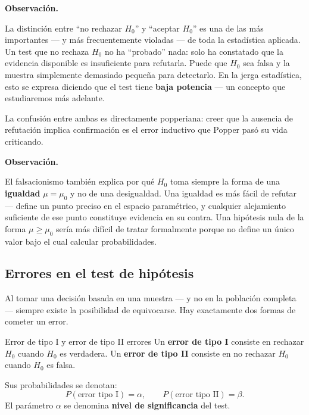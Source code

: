 \documentclass[12pt, a4paper]{book}
\newenvironment{observacion}{%
    \par\medskip\noindent\textbf{\color{azul}Observaci\'{o}n.}\enspace\itshape
}{\par\medskip}
\numberwithin{equation}{chapter}
\begin{document}
\begin{observacion}
	La distinci\'{o}n entre ``no rechazar $H_0$'' y
	``aceptar $H_0$'' es una de las m\'{a}s importantes
	--- y m\'{a}s frecuentemente violadas --- de toda
	la estad\'{i}stica aplicada. Un test que no rechaza
	$H_0$ no ha ``probado'' nada: solo ha constatado
	que la evidencia disponible es insuficiente para
	refutarla. Puede que $H_0$ sea falsa y la muestra
	simplemente demasiado peque\~{n}a para detectarlo.
	En la jerga estad\'{i}stica, esto se expresa
	diciendo que el test tiene \textbf{baja potencia}
	--- un concepto que estudiaremos m\'{a}s adelante.
	
	La confusi\'{o}n entre ambas es directamente
	popperiana: creer que la ausencia de refutaci\'{o}n
	implica confirmaci\'{o}n es el error inductivo que
	Popper pas\'{o} su vida criticando.
\end{observacion}

\begin{observacion}
	El falsacionismo tambi\'{e}n explica por qu\'{e}
	$H_0$ toma siempre la forma de una \textbf{igualdad}
	$\mu = \mu_0$ y no de una desigualdad. Una igualdad
	es m\'{a}s f\'{a}cil de refutar --- define un punto
	preciso en el espacio param\'{e}trico, y cualquier
	alejamiento suficiente de ese punto constituye
	evidencia en su contra. Una hip\'{o}tesis nula
	de la forma $\mu \geq \mu_0$ ser\'{i}a m\'{a}s
	dif\'{i}cil de tratar formalmente porque no define
	un \'{u}nico valor bajo el cual calcular
	probabilidades.
\end{observacion}

\subsection{Errores en el test de hip\'{o}tesis}

Al tomar una decisi\'{o}n basada en una muestra ---
y no en la poblaci\'{o}n completa --- siempre existe
la posibilidad de equivocarse. Hay exactamente dos
formas de cometer un error.

\begin{definicion}{Error de tipo I y error de tipo II}
	{errores}
	Un \textbf{error de tipo I} consiste en rechazar
	$H_0$ cuando $H_0$ es verdadera. Un \textbf{error
		de tipo II} consiste en no rechazar $H_0$ cuando
	$H_0$ es falsa.
	
	Sus probabilidades se denotan:
	\[
	P(\text{error tipo I}) = \alpha, \qquad
	P(\text{error tipo II}) = \beta.
	\]
	El par\'{a}metro $\alpha$ se denomina \textbf{nivel
		de significancia} del test.
\end{definicion}
\end{document}
